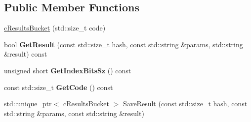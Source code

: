 \subsection*{Public Member Functions}
\begin{DoxyCompactItemize}
\item 
\hyperlink{classresultsDB_1_1cResultsBucket_a959c37146bc088b2d8d69d51c63ae227}{c\-Results\-Bucket} (std\-::size\-\_\-t code)
\item 
\hypertarget{classresultsDB_1_1cResultsBucket_af6c2a4b7bc33ba06861ddb123a79f2be}{bool {\bfseries Get\-Result} (const std\-::size\-\_\-t hash, const std\-::string \&params, std\-::string \&result) const }\label{classresultsDB_1_1cResultsBucket_af6c2a4b7bc33ba06861ddb123a79f2be}

\item 
\hypertarget{classresultsDB_1_1cResultsBucket_a757169c7e12fe6db9f46ee889b34cd8b}{unsigned short {\bfseries Get\-Index\-Bits\-Sz} () const }\label{classresultsDB_1_1cResultsBucket_a757169c7e12fe6db9f46ee889b34cd8b}

\item 
\hypertarget{classresultsDB_1_1cResultsBucket_abf3099f9714a88cecc53f8211355e791}{const std\-::size\-\_\-t {\bfseries Get\-Code} () const }\label{classresultsDB_1_1cResultsBucket_abf3099f9714a88cecc53f8211355e791}

\item 
std\-::unique\-\_\-ptr$<$ \hyperlink{classresultsDB_1_1cResultsBucket}{c\-Results\-Bucket} $>$ \hyperlink{classresultsDB_1_1cResultsBucket_a280d00036ff59351e330b14eec2a070f}{Save\-Result} (const std\-::size\-\_\-t hash, const std\-::string \&params, const std\-::string \&result)
\end{DoxyCompactItemize}
